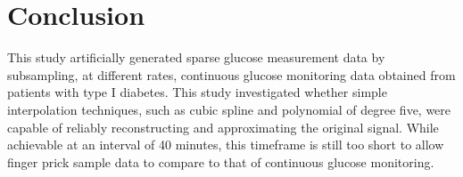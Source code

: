 
\section{Conclusion}

 
 This study artificially generated sparse glucose measurement data by subsampling, at different rates, continuous glucose monitoring data obtained from patients with type I diabetes. This study investigated whether simple interpolation techniques, such as cubic spline and polynomial of degree five, were capable of reliably reconstructing and approximating the original signal. While achievable at an interval of 40 minutes, this timeframe is still too short to allow finger prick sample data to compare to that of continuous glucose monitoring.
 